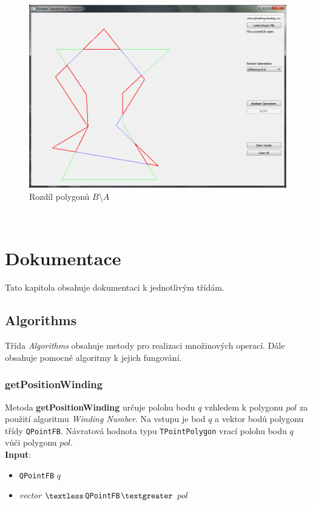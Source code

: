 \documentclass[a4paper, 12pt]{article}
\begin{document}
\begin{figure}[t!]
	\centering
	\includegraphics[width=14.5cm]{./pictures/app_diffBA.png}
	\caption{Rozdíl polygonů $B$\textbackslash$A$}
\end{figure}
~\\
\clearpage


 
\section{Dokumentace}
Tato kapitola obsahuje dokumentaci k jednotlivým třídám.

\subsection{Algorithms}
Třída \textit{Algorithms} obsahuje metody pro realizaci množinových operací. Dále obsahuje pomocné algoritmy k jejich fungování.

\subsubsection*{getPositionWinding}
Metoda \textbf{getPositionWinding} určuje polohu bodu $q$ vzhledem k polygonu $pol$ za použití algoritmu \textsl{Winding Number}. Na vstupu je bod $q$ a vektor bodů polygonu třídy \texttt{QPointFB}. Návratová hodnota typu \texttt{TPointPolygon} vrací polohu bodu $q$ vůči polygonu $pol$.\\

\textbf{Input}:
\begin{itemize}
\item \texttt{QPointFB} $q$
\item \textsl{vector} $\textless$\texttt{QPointFB}$\textgreater$ $pol$
\end{itemize}
\end{document}
